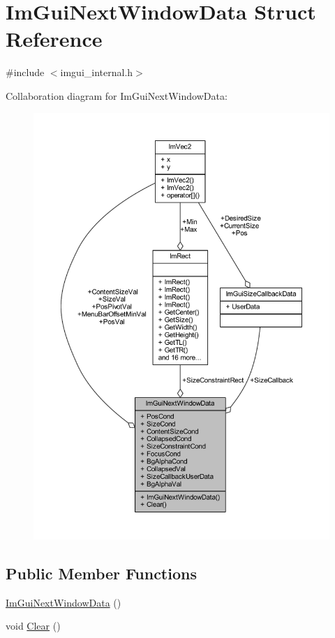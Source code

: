 \hypertarget{struct_im_gui_next_window_data}{}\section{Im\+Gui\+Next\+Window\+Data Struct Reference}
\label{struct_im_gui_next_window_data}


{\ttfamily \#include $<$imgui\+\_\+internal.\+h$>$}



Collaboration diagram for Im\+Gui\+Next\+Window\+Data\+:
\nopagebreak
\begin{figure}[H]
\begin{center}
\leavevmode
\includegraphics[width=350pt]{struct_im_gui_next_window_data__coll__graph}
\end{center}
\end{figure}
\subsection*{Public Member Functions}
\begin{DoxyCompactItemize}
\item 
\mbox{\hyperlink{struct_im_gui_next_window_data_a0471ae42c04fce2e38c9cd8c37690b09}{Im\+Gui\+Next\+Window\+Data}} ()
\item 
void \mbox{\hyperlink{struct_im_gui_next_window_data_ae20d7287a7f96592363988f138e11bd5}{Clear}} ()
\end{DoxyCompactItemize}
